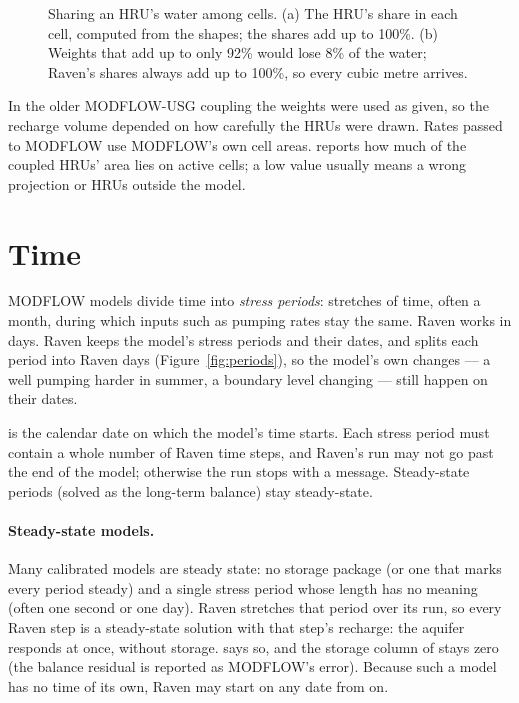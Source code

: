 \begin{figure}[!htbp]\centering
\caption{Sharing an HRU's water among cells. (a) The HRU's share in each cell, computed from the shapes; the shares add up to 100\%. (b) Weights that add up to only 92\% would lose 8\% of the water; Raven's shares always add up to 100\%, so every cubic metre arrives.}\label{fig:linking}
\end{figure}

In the older MODFLOW-USG coupling the weights were used as given, so the recharge volume depended on how carefully the HRUs
were drawn. Rates passed to MODFLOW use MODFLOW's own cell areas.  reports how much of the coupled
HRUs' area lies on active cells; a low value usually means a wrong projection or HRUs outside the model.

\section{Time}\label{sec:existingtime}
MODFLOW models divide time into \emph{stress periods}: stretches of time, often a month, during which inputs such as pumping
rates stay the same. Raven works in days. Raven keeps the model's stress periods and their dates, and splits each period into
Raven days (Figure~\ref{fig:periods}), so the model's own changes --- a well pumping harder in summer, a boundary level
changing --- still happen on their dates.

 is the calendar date on which the model's time starts. Each stress period must contain a whole number of
Raven time steps, and Raven's run may not go past the end of the model; otherwise the run stops with a message. Steady-state
periods (solved as the long-term balance) stay steady-state.

\paragraph{Steady-state models.} Many calibrated models are steady state: no storage package (or one that marks every period
steady) and a single stress period whose length has no meaning (often one second or one day). Raven stretches that period
over its run, so every Raven step is a steady-state solution with that step's recharge: the aquifer responds at once, without
storage.  says so, and the storage column of  stays zero (the balance residual is
reported as MODFLOW's error). Because such a model has no time of its own, Raven may start on any date from
 on.

